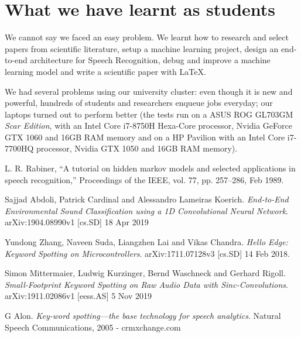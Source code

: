 \documentclass[conference]{IEEEtran}
\begin{document}
\section*{What we have learnt as students}
We cannot say we faced an easy problem. We learnt how to research and select papers from scientific literature, setup a machine learning project, design an end-to-end architecture for Speech Recognition, debug and improve a machine learning model and write a scientific paper with \LaTeX\xspace.

We had several problems using our university cluster: even though it is new and powerful, hundreds of students and researchers enqueue jobs everyday; our laptops turned out to perform better (the tests run on a ASUS ROG GL703GM \textit{Scar Edition}, with an Intel Core i7-8750H Hexa-Core processor, Nvidia  GeForce GTX 1060 and 16GB RAM memory and on a HP Pavilion with an Intel Core i7-7700HQ processor, Nvidia GTX 1050 and 16GB RAM memory).

\begin{thebibliography}{1}
L. R. Rabiner, “A tutorial on hidden markov models and selected applications in speech recognition,” Proceedings of the IEEE, vol. 77, pp. 257–286, Feb 1989.

Sajjad Abdoli, Patrick Cardinal and Alessandro Lameiras Koerich. \textit{End-to-End Environmental Sound Classification using a 1D Convolutional Neural Network}. arXiv:1904.08990v1 [cs.SD] 18 Apr 2019

Yundong Zhang, Naveen Suda, Liangzhen Lai and Vikas Chandra. \textit{Hello Edge: Keyword Spotting on Microcontrollers}. arXiv:1711.07128v3 [cs.SD] 14 Feb 2018.

Simon Mittermaier, Ludwig Kurzinger, Bernd Waschneck and Gerhard Rigoll. \textit{Small-Footprint Keyword Spotting on Raw Audio Data with Sinc-Convolutions}. arXiv:1911.02086v1 [eess.AS] 5 Nov 2019

G Alon. \textit{Key-word spotting—the base technology for speech analytics}. Natural Speech Communications, 2005 - crmxchange.com
\end{thebibliography}
\end{document}

